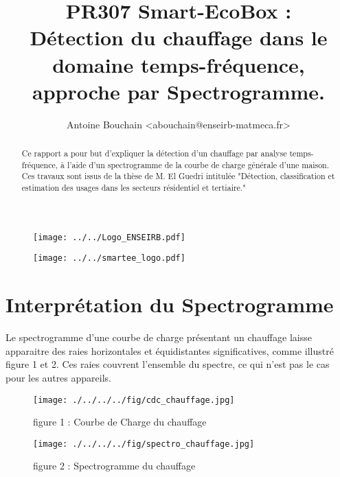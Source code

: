 \documentclass[10pt,a4paper]{article}
\title{PR307 Smart-EcoBox : \\
Détection du chauffage dans le domaine temps-fréquence, approche par Spectrogramme.}
\author{Antoine Bouchain <abouchain@enseirb-matmeca.fr> \\}
\begin{document}
\maketitle

\begin{figure}[ht]
\begin{center}
\noindent \texttt{[image: ../../Logo\_ENSEIRB.pdf]}
\end{center}
\end{figure}
\begin{figure}[ht]
\begin{center}
\noindent \texttt{[image: ../../smartee\_logo.pdf]}
\end{center}
\end{figure}


\newpage

\tableofcontents

\newpage
\begin{abstract}
Ce rapport a pour but d'expliquer la détection d'un chauffage par analyse temps-fréquence, à l'aide d'un spectrogramme de la courbe de charge générale d'une maison. Ces travaux sont issus de la thèse de M. El Guedri intitulée "Détection, classification et estimation des usages dans les secteurs résidentiel et tertiaire." 
\end{abstract}

\section{Interprétation du Spectrogramme}
Le spectrogramme d'une courbe de charge présentant un chauffage laisse apparaitre des raies horizontales et équidistantes significatives, comme illustré figure 1 et 2. Ces raies couvrent l'ensemble du spectre, ce qui n'est pas le cas pour les autres appareils.

\begin{figure}[!h]
\begin{center}
\texttt{[image: ./../../../fig/cdc\_chauffage.jpg]}
\caption{figure 1 : Courbe de Charge du chauffage}
\label{Figure}
\end{center}
\end{figure}

\begin{figure}[!h]
\begin{center}
\texttt{[image: ./../../../fig/spectro\_chauffage.jpg]}
\caption{figure 2 : Spectrogramme du chauffage}
\label{Figure}
\end{center}
\end{figure}
\end{document}
